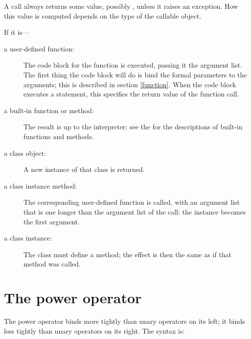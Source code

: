A call always returns some value, possibly , unless it
raises an exception.  How this value is computed depends on the type
of the callable object.

If it is---

\begin{description}

\item[a user-defined function:] The code block for the function is
executed, passing it the argument list.  The first thing the code
block will do is bind the formal parameters to the arguments; this is
described in section \ref{function}.  When the code block executes a
 statement, this specifies the return value of the
function call.

\item[a built-in function or method:] The result is up to the
interpreter; see the  for the descriptions of built-in functions and
methods.

\item[a class object:] A new instance of that class is returned.

\item[a class instance method:] The corresponding user-defined
function is called, with an argument list that is one longer than the
argument list of the call: the instance becomes the first argument.

\item[a class instance:] The class must define a 
method; the effect is then the same as if that method was called.

\end{description}


\section{The power operator\label{power}}

The power operator binds more tightly than unary operators on its
left; it binds less tightly than unary operators on its right.  The
syntax is:

